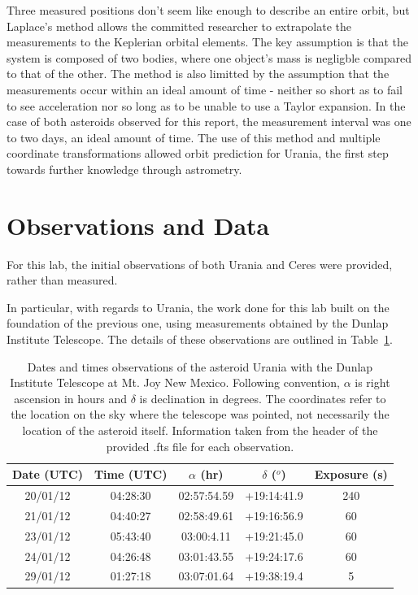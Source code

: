 \documentclass[a4paper,12pt]{article}
\begin{document}
Three measured positions don't seem like enough to describe an entire orbit, but Laplace's method allows the committed researcher to extrapolate the measurements to the Keplerian orbital elements. The key assumption is that the system is composed of two bodies, where one object's mass is negligble compared to that of the other. The method is also limitted by the assumption that the measurements occur within an ideal amount of time - neither so short as to fail to see acceleration nor so long as to be unable to use a Taylor expansion. In the case of both asteroids observed for this report, the measurement interval was one to two days, an ideal amount of time. The use of this method and multiple coordinate transformations allowed orbit prediction for Urania, the first step towards further knowledge through astrometry.


\section{Observations and Data}
\label{sec:obs}

For this lab, the initial observations of both Urania and Ceres were provided, rather than measured.

In particular, with regards to Urania, the work done for this lab built on the foundation of the previous one, using measurements obtained by the Dunlap Institute Telescope. The details of these observations are outlined in Table~\ref{tab:datatable}.

\begin{table}[!htbp]
  \centering
  \begin{tabular}{|c||c||c||c||c|}
  \hline
   Date (UTC) & Time (UTC) & $\alpha$ (hr) & $\delta$ ($^o$) & Exposure (s) \\
   \hline
   \hline
   20/01/12 & 04:28:30 & 02:57:54.59 & +19:14:41.9 & 240\\
   \hline
   21/01/12 & 04:40:27 & 02:58:49.61 & +19:16:56.9 & 60\\
   \hline
   23/01/12 & 05:43:40 & 03:00:4.11 & +19:21:45.0 & 60 \\
   \hline
   24/01/12 & 04:26:48 & 03:01:43.55 & +19:24:17.6 & 60 \\
   \hline
   29/01/12 & 01:27:18 & 03:07:01.64 & +19:38:19.4 & 5\\
   \hline
   \end{tabular}
    \caption{Dates and times observations of the asteroid Urania with the Dunlap Institute Telescope at Mt. Joy New Mexico. Following convention, $\alpha$ is right ascension in hours and $\delta$ is declination in degrees. The coordinates refer to the location on the sky where the telescope was pointed, not necessarily the location of the asteroid itself. Information taken from the header of the provided .fts file for each observation.}
    \label{tab:datatable}
\end{table}
\end{document}
